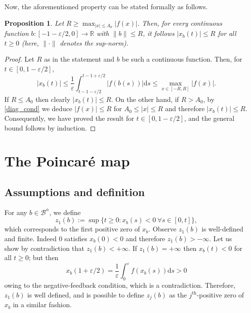 \documentclass[a4paper,11pt]{article}
\theoremstyle{plain}
\newtheorem{prop}[thm]{Proposition}
\theoremstyle{definition}
\theoremstyle{definition}
\newcommand{\R}{\mathbb{R}}
\newcommand{\dd}{\mathrm{d}}
\numberwithin{equation}{section}
\begin{document}
Now, the aforementioned property  can be stated formally as follows.

\begin{prop}\label{unif_bound}
	Let $R\geq \max_{|x|\leq A_0}|f(x)|$. Then, for every continuous function $b\colon [-1-\varepsilon/2,0]\to \R$ with $\|b\|\leq R$, it follows $|x_b(t)|\leq R$ for all $t\geq 0$ (here, $\|\cdot\|$ denotes the sup-norm).
\end{prop}
\begin{proof}
Let $R$ as in the statement and $b$ be such a continuous function. Then, for $t\in[0,1-\varepsilon/2]$,
\[
    |x_b(t)| \leq \frac{1}{\varepsilon}\int_{t-1-\varepsilon/2}^{t-1+\varepsilon/2} |f(b(s))| \dd s \leq \max_{x\in[-R,R]} |f(x)|.
\]
If $R\leq A_0$ then clearly $|x_b(t)|\leq R$. On the other hand, if $R>A_0$, by \eqref{diag_cond} we deduce $|f(x)|\leq R$ for $A_0\leq|x|\leq R$ and therefore $|x_b(t)|\leq R$. Consequently, we have proved the result for $t\in[0,1-\varepsilon/2]$, and the general bound follows by induction.
\end{proof}












\section{The Poincaré map}\label{sec:Poincare}

\subsection{Assumptions and definition}

For any $b\in \mathcal{B}^\alpha$, we define 
\begin{equation}\label{eq:z_1}
	z_1(b):= \sup\{ t\geq 0 \colon x_b(s)<0~\forall s\in [0,t] \},
\end{equation}
which corresponds to the first positive zero of $x_b$. Observe $z_1(b)$ is well-defined and finite. Indeed  $0$ satisfies $x_b(0)<0$ and therefore $z_1(b)>-\infty$. Let us show by contradiction that $z_1(b)<+\infty$. If $z_1(b)=+\infty$ then $x_b(t)<0$ for all $t\geq0$; but then
\[
    x_b(1+\varepsilon/2) = \frac{1}{\varepsilon} \int_{0}^{\varepsilon} f(x_b(s)) \dd s>0
\]
owing to the negative-feedback condition, which is a contradiction. Therefore, $z_1(b)$ is well defined, and is possible to define $z_j(b)$ as the $j^{\text{th}}$-positive zero of $x_b$ in a similar fashion.
\end{document}

